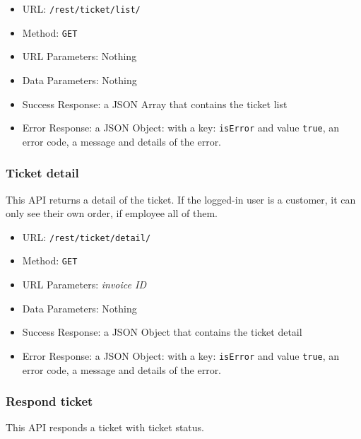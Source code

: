 \begin{itemize}
    \item URL: \texttt{/rest/ticket/list/}
    \item Method: \texttt{GET}
    \item URL Parameters: Nothing
    \item Data Parameters: Nothing
    \item Success Response:  a JSON Array that contains the ticket list
    \item Error Response: a JSON Object: with a key: \texttt{isError}  and value \texttt{true}, an error code, a message and details of the error.
\end{itemize}

\subsubsection*{Ticket detail}

This API returns a detail of the ticket.
If the logged-in user is a customer, it can only see their own order, if employee all of them.

\begin{itemize}
    \item URL: \texttt{/rest/ticket/detail/}
    \item Method: \texttt{GET}
    \item URL Parameters: \textit{invoice ID}
    \item Data Parameters: Nothing
    \item Success Response: a JSON Object that contains the ticket detail
    \item Error Response: a JSON Object: with a key: \texttt{isError}  and value \texttt{true}, an error code, a message and details of the error.
\end{itemize}


\subsubsection*{Respond ticket}

This API responds a ticket with ticket status.

